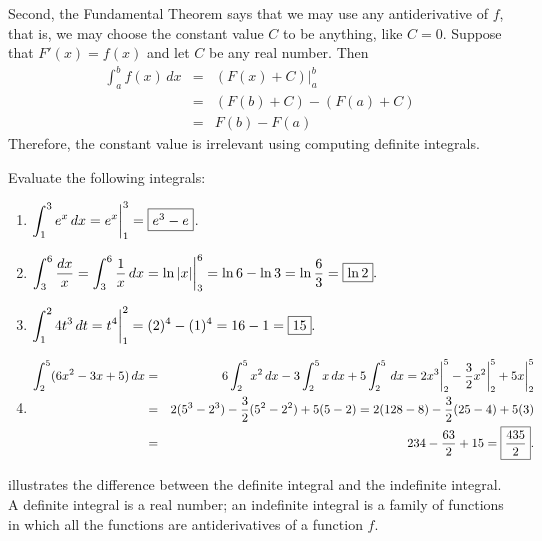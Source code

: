 \documentclass{book}
\newcommand{\dx}{\,dx}
\newcommand{\dt}{\,dt}
\newcommand{\dint}{\displaystyle \int}
\begin{document}
Second, the Fundamental Theorem says that we may use any antiderivative of $f$, that is, we may choose the constant value $C$ to be anything, like $C= 0$. Suppose that $F'(x) = f(x)$ and let $C$ be any real number. Then 
\begin{eqnarray*}
\int_a^b f(x)\dx &=& (F(x) + C)\bigg|_a^b\\
&=& (F(b) + C) - (F(a) + C)\\
&=& F(b) - F(a)
\end{eqnarray*} Therefore, the constant value is irrelevant using computing definite integrals. 

\begin{Exam}\label{exam:antipowerule} Evaluate the following integrals:
\begin{enumerate}
\item $\dint_1^3 e^x\dx = e^x\bigg\vert_1^3 = \fbox{$e^3-e$}$.\\

\item $\dint_3^6 \dfrac{dx}{x} = \int_3^6 \dfrac{1}{x}\dx = \ln|x|\bigg\vert_{3}^6 = \ln 6 - \ln 3 = \ln\dfrac{6}{3} = \fbox{$\ln 2$}.$\\

\item $\dint_1^2 4t^3\dt = t^4\bigg|_1^2 = (2)^4 - (1)^4 = 16-1 = \fbox{15}.$\\

\item \begin{eqnarray*}
\int_2^5 (6x^2 - 3x + 5)\dx &=& 6\int_2^5 x^2\dx - 3\int_2^5 x\dx + 5\int_2^5 \dx = 2x^3\bigg|_2^5 - \dfrac{3}{2}x^2\bigg|_2^5 + 5x\bigg|_2^5\\
&=& 2(5^3 - 2^3) - \dfrac{3}{2}(5^2 - 2^2) + 5(5-2) = 2(128-8) - \dfrac{3}{2}(25-4) + 5(3)\\
&=& 234 - \dfrac{63}{2} + 15 = \fbox{$\dfrac{435}{2}$}.
\end{eqnarray*}
\end{enumerate}
\end{Exam}\vs

 illustrates the difference between the definite integral and the indefinite integral. A definite integral is a real number; an indefinite integral is a family of functions in which all the functions are antiderivatives of a function $f$.
\end{document}
